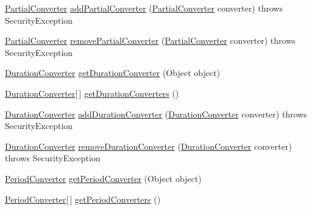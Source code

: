 \begin{DoxyCompactItemize}
\item 
\hyperlink{interfaceorg_1_1joda_1_1time_1_1convert_1_1_partial_converter}{Partial\-Converter} \hyperlink{classorg_1_1joda_1_1time_1_1convert_1_1_converter_manager_a7e3d9dbb7e6b148d835338758f06aecc}{add\-Partial\-Converter} (\hyperlink{interfaceorg_1_1joda_1_1time_1_1convert_1_1_partial_converter}{Partial\-Converter} converter)  throws Security\-Exception 
\item 
\hyperlink{interfaceorg_1_1joda_1_1time_1_1convert_1_1_partial_converter}{Partial\-Converter} \hyperlink{classorg_1_1joda_1_1time_1_1convert_1_1_converter_manager_af428354b36dba54293178df9cbc34e6a}{remove\-Partial\-Converter} (\hyperlink{interfaceorg_1_1joda_1_1time_1_1convert_1_1_partial_converter}{Partial\-Converter} converter)  throws Security\-Exception 
\item 
\hyperlink{interfaceorg_1_1joda_1_1time_1_1convert_1_1_duration_converter}{Duration\-Converter} \hyperlink{classorg_1_1joda_1_1time_1_1convert_1_1_converter_manager_a8b767f671feab3986ac25248b86bc26c}{get\-Duration\-Converter} (Object object)
\item 
\hyperlink{interfaceorg_1_1joda_1_1time_1_1convert_1_1_duration_converter}{Duration\-Converter}\mbox{[}$\,$\mbox{]} \hyperlink{classorg_1_1joda_1_1time_1_1convert_1_1_converter_manager_ad6f52b6d93fabc0808e17fe564fe7b26}{get\-Duration\-Converters} ()
\item 
\hyperlink{interfaceorg_1_1joda_1_1time_1_1convert_1_1_duration_converter}{Duration\-Converter} \hyperlink{classorg_1_1joda_1_1time_1_1convert_1_1_converter_manager_aa09df8d826de3482a53579bd4c42c295}{add\-Duration\-Converter} (\hyperlink{interfaceorg_1_1joda_1_1time_1_1convert_1_1_duration_converter}{Duration\-Converter} converter)  throws Security\-Exception 
\item 
\hyperlink{interfaceorg_1_1joda_1_1time_1_1convert_1_1_duration_converter}{Duration\-Converter} \hyperlink{classorg_1_1joda_1_1time_1_1convert_1_1_converter_manager_a727f622fa082e48eef493dd03dba0a95}{remove\-Duration\-Converter} (\hyperlink{interfaceorg_1_1joda_1_1time_1_1convert_1_1_duration_converter}{Duration\-Converter} converter)  throws Security\-Exception 
\item 
\hyperlink{interfaceorg_1_1joda_1_1time_1_1convert_1_1_period_converter}{Period\-Converter} \hyperlink{classorg_1_1joda_1_1time_1_1convert_1_1_converter_manager_a93f39c87f0b15ef73e74748aa4cc4e44}{get\-Period\-Converter} (Object object)
\item 
\hyperlink{interfaceorg_1_1joda_1_1time_1_1convert_1_1_period_converter}{Period\-Converter}\mbox{[}$\,$\mbox{]} \hyperlink{classorg_1_1joda_1_1time_1_1convert_1_1_converter_manager_a6b422578b299f1e69564178a007ea351}{get\-Period\-Converters} ()

\end{DoxyCompactItemize}

